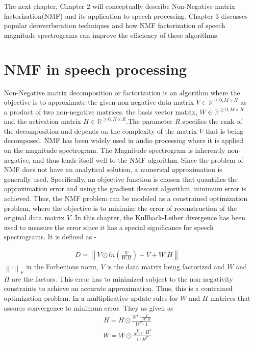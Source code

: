 \documentclass[12pt, a4paper, oneside]{book}
\begin{document}
The next chapter, Chapter 2 will conceptually describe Non-Negative matrix factorization(NMF) and its application to speech processing. Chapter 3 discusses popular dereverberation techniques and how NMF factorization of speech magnitude spectrograms can improve the efficiency of these algorithms. 











\chapter{NMF in speech processing}  %



Non-Negative matrix decomposition or factorization is an algorithm where the objective is to approximate the given non-negative data matrix  $V \in \mathbb{R}^{\geq 0, M \times N}$ as a product of two non-negative matrices. the basis vector matrix,  $W \in \mathbb{R}^{\geq 0, M \times R}$ and the activation matrix $H \in \mathbb{R}^{\geq 0, N \times R}$.The parameter $R$ specifies the rank of the decomposition and depends on the complexity of the matrix $V$ that is being decomposed. NMF has been widely used in audio processing where it is applied on the magnitude spectrogram. The Magnitude spectrogram is inherently non-negative, and thus lends itself well to the NMF algorithm.
Since the problem of NMF does not have an analytical solution, a numerical approximation is generally used. Specifically, an objective function is chosen that quantifies the approximation error and using the gradient descent algorithm, minimum error is achieved. Thus, the NMF problem can be modeled as a constrained optimization problem, where the objective is to minimize the error of reconstruction of the original data matrix $V$. In this chapter, the Kullback-Leiber divergence has been used to measure the error since it has a special significance for speech spectrograms. It is defined as - 

\begin{align}
D = \left \| V \odot ln \left (  \frac{V}{W.H} \right ) -V +W.H \right \| \label{kldiv}
\end{align}
 $\left \| \cdot  \right \|_F$ in the Forbenious norm, $V$ is the data matrix being factorized and $W$ and $H$ are the factors.
This error has to minimized subject to the non-negativity constraints to achieve an accurate approximation. Thus, this is a contrained optimization problem. In \cite{lee} a multiplicativs update rules for $W$ and $H$ matrices that assures convergence to minimum error. They as given as
\begin{align}
H = H \odot \frac{W^T \cdot \frac{V}{W\cdot H} }{W^T\cdot 1} \label{H updates}
\end{align}
\begin{align}
W = W \odot \frac{\frac{V}{W\cdot H}\cdot H^T   }{ 1 \cdot H^T} \label{W updates}
\end{align}
\end{document}
